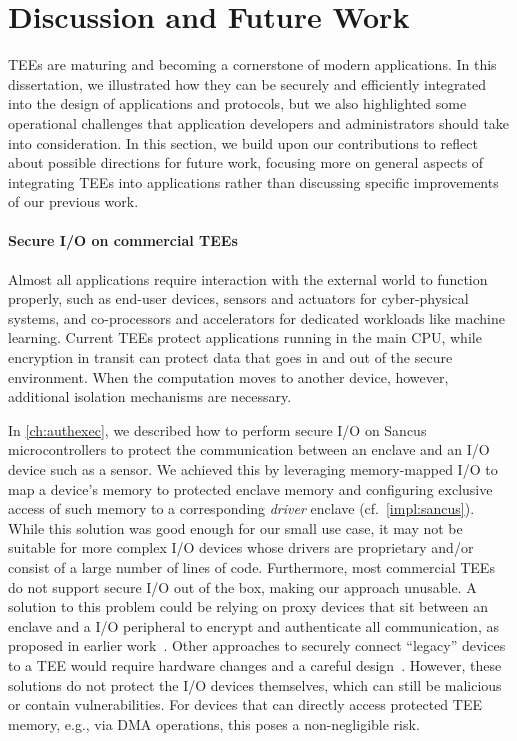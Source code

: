 \section{Discussion and Future Work}
\label{thesis:concl-future}

\acp{TEE} are maturing and becoming a cornerstone of modern applications. In
this dissertation, we illustrated how they can be securely and efficiently
integrated into the design of applications and protocols, but we also
highlighted some operational challenges that application developers and
administrators should take into consideration. In this section, we build upon
our contributions to reflect about possible directions for future work, focusing
more on general aspects of integrating \acp{TEE} into applications rather than
discussing specific improvements of our previous work.

\paragraph{Secure I/O on commercial TEEs}

Almost all applications require interaction with the external world to function
properly, such as end-user devices, sensors and actuators for cyber-physical
systems, and co-processors and accelerators for dedicated workloads like machine
learning. Current \acp{TEE} protect applications running in the main CPU, while
encryption in transit can protect data that goes in and out of the secure
environment. When the computation moves to another device, however, additional
isolation mechanisms are necessary.

In \cref{ch:authexec}, we described how to perform secure I/O on Sancus
microcontrollers to protect the communication between an enclave and an I/O
device such as a sensor. We achieved this by leveraging memory-mapped I/O to map
a device's memory to protected enclave memory and configuring exclusive access
of such memory to a corresponding \emph{driver} enclave
(cf.~\cref{impl:sancus}). While this solution was good enough for our small use
case, it may not be suitable for more complex I/O devices whose drivers are
proprietary and/or consist of a large number of lines of code. Furthermore, most
commercial \acp{TEE} do not support secure I/O out of the box, making our
approach unusable. A solution to this problem could be relying on proxy devices
that sit between an enclave and a I/O peripheral to encrypt and authenticate all
communication, as proposed in earlier
work~\cite{BASTION-SGX,SGX-USB,eskandarian2019fidelius}. Other approaches to
securely connect ``legacy'' devices to a \ac{TEE} would require hardware changes
and a careful design~\cite{bertschi2024devlore}. However, these solutions do not
protect the I/O devices themselves, which can still be malicious or contain
vulnerabilities. For devices that can directly access protected \ac{TEE} memory,
e.g., via \ac{DMA} operations, this poses a non-negligible risk.

